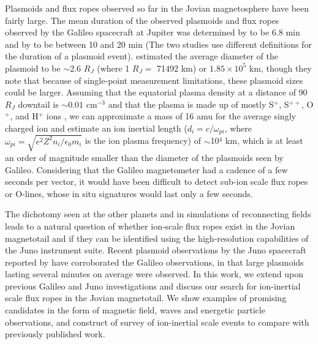 Plasmoids and flux ropes observed so far in the Jovian magnetosphere have been fairly large. The mean duration of the observed plasmoids and flux ropes observed by the Galileo spacecraft at Jupiter was determined by \cite{Vogt2014} to be $6.8$ min and by \cite{Kronberg2008MassParameters} to be between 10 and 20 min (The two studies use different definitions for the duration of a plasmoid event). \cite{Vogt2014} estimated the average diameter of the plasmoid to be $\sim$2.6 $R_J$ (where 1 $R_J =$  71492 km) or $1.85 \times 10^5$ km, though they note that because of single‐point measurement limitations, these plasmoid sizes could be larger. Assuming that the equatorial plasma density at a distance of 90 $R_J$ downtail is $\sim0.01$ cm$^{-3}$ \cite{Bagenal2011b} and that the plasma is made up of mostly S$^{+}$, S$^{++}$, O$^{+}$, and H$^{+}$ ions \cite{Kim2020SurveyObservations}, we can approximate a mass of 16 amu for the average singly charged ion and estimate an ion inertial length ($d_i=c/\omega_{pi}$, where $\omega_{pi}=\sqrt{e^2 Z^2 n_i/\epsilon_0 m_i}$ is the ion plasma frequency) of $\sim$10$^4$ km, which is at least an order of magnitude smaller than the diameter of the plasmoids seen by Galileo. Considering that the Galileo magnetometer had a cadence of a few seconds per vector, it would have been difficult to detect sub-ion scale flux ropes or O‐lines, whose in situ signatures would last only a few seconds.

The dichotomy seen at the other planets and in simulations of reconnecting fields leads to a natural question of whether ion‐scale flux ropes exist in the Jovian magnetotail and if they can be identified using the high‐resolution capabilities of the Juno instrument suite. Recent plasmoid observations by the Juno spacecraft reported by \cite{Vogt2020MagnetotailObservations} have corroborated the Galileo observations, in that large plasmoids lasting several minutes on average were observed. In this work, we extend upon previous Galileo and Juno investigations and discuss our search for ion-inertial scale flux ropes in the Jovian magnetotail. We show examples of promising candidates in the form of magnetic field, waves and energetic particle observations, and construct of survey of ion-inertial scale events to compare with previously published work. 


